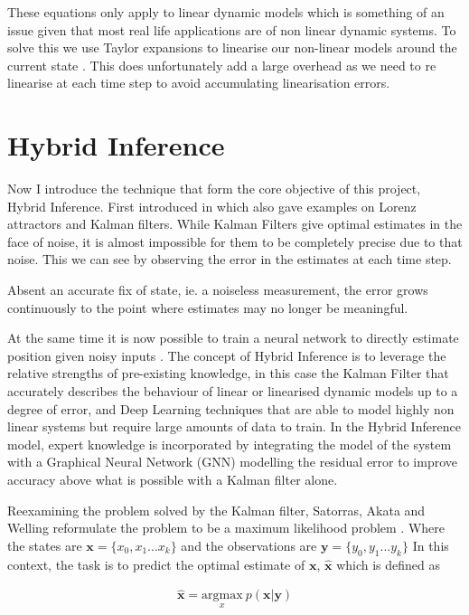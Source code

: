 \documentclass[]{../resources/final_report}
\begin{document}
These equations only apply to linear dynamic models which is something of an issue given that most 
real life applications are of non linear dynamic systems. To solve this we use Taylor expansions to 
linearise our non-linear models around the current state \cite{ExtendedKalmanNasa}. This does 
unfortunately add a large overhead as we need to re linearise at each time step to avoid 
accumulating linearisation errors.

\section{Hybrid Inference}

Now I introduce the technique that form the core objective of this project, Hybrid Inference. First 
introduced in \cite{HybridInference} which also gave examples on Lorenz attractors and 
Kalman filters. While Kalman Filters give optimal estimates in the face of noise, it is almost 
impossible for them to be completely precise due to that noise. This we can see by observing the 
error in the estimates at each time step.

Absent an accurate fix of state, ie. a noiseless measurement, the error grows 
continuously to the point where estimates may no longer be meaningful.

At the same time it is now possible to train a neural network to directly estimate position given
noisy inputs \cite{NNStateEstimation}. The concept of Hybrid Inference is to leverage the relative 
strengths of pre-existing knowledge, in this case the Kalman Filter that accurately describes the 
behaviour of linear or linearised dynamic models up to a degree of error, and Deep Learning techniques 
that are able to model highly non linear systems but require large amounts of data to train.
In the Hybrid Inference model, expert knowledge is incorporated by integrating the model of the 
system with a Graphical Neural Network (GNN) modelling the residual error to improve accuracy above what is possible with a 
Kalman filter alone.

\pagebreak
Reexamining the problem solved by the Kalman filter, Satorras, Akata and Welling reformulate the 
problem to be a maximum likelihood problem \cite{HybridInference}.
Where the states are $\mathbf{x} = \{x_0, x_1 ... x_k\}$ and the observations are $\mathbf{y} = \{y_0, y_1 ... y_k\}$
In this context, the task is to predict the optimal estimate of $\mathbf{x}$, $\mathbf{\hat{x}}$ which is defined as

\begin{align}
  \mathbf{\hat{x}} = \underset{x}{\text{argmax}}\ p(\mathbf{x}|\mathbf{y})
\end{align}
\end{document}

